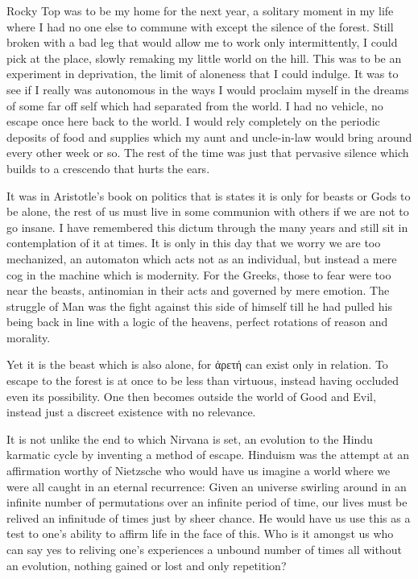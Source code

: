 \documentclass[ebook, 10pt, openright, onecolumn]{memoir}
\newcommand{\textgreek}[1]{\begingroup\fontencoding{LGR}\selectfont#1\endgroup}
\begin{document}
Rocky Top was to be my home for the next year, a solitary moment in my life
where I had no one else to commune with except the silence of the forest.  Still
broken with a bad leg that would allow me to work only intermittently, I could
pick at the place, slowly remaking my little world on the hill.  This was to be
an experiment in deprivation, the limit of aloneness that I could indulge.  It
was to see if I really was autonomous in the ways I would proclaim myself in the
dreams of some far off self which had separated from the world.  I had no
vehicle, no escape once here back to the world.  I would rely completely on the
periodic deposits of food and supplies which my aunt and uncle-in-law would
bring around every other week or so.  The rest of the time  was just that
pervasive silence which builds to a crescendo that hurts the ears.

It was in Aristotle's book on politics that is states it is only for beasts or
Gods to be alone, the rest of us must live in some communion with others if we
are not to go insane.  I have remembered this dictum through the many years and
still sit in contemplation of it at times.  It is only in this day that we worry
we are too mechanized, an automaton which acts not as an individual, but instead
a mere cog in the machine which is modernity.  For the Greeks, those to fear
were too near the beasts, antinomian in their acts and governed by mere emotion.
The struggle of Man was the fight against this side of himself till he had
pulled his being back in line with a logic of the heavens, perfect rotations of
reason and morality.

Yet it is the beast which is also alone, for \textgreek{ἀρετή} can exist only in
relation.  To escape to the forest is at once to be less than virtuous, instead
having occluded even its possibility.  One then becomes outside the world of
Good and Evil, instead just a discreet existence with no relevance.

It is not unlike the end to which Nirvana is set, an evolution to the Hindu
karmatic cycle by inventing a method of escape.  Hinduism was the attempt at an
affirmation worthy of Nietzsche who would have us imagine a world where we were
all caught in an eternal recurrence: Given an universe swirling around in an
infinite number of permutations over an infinite period of time, our lives must
be relived an infinitude of times just by sheer chance.  He would have us use
this as a test to one's ability to affirm life in the face of this.  Who is it
amongst us who can say yes to reliving one's experiences a unbound number of
times all without an evolution, nothing gained or lost and only repetition?
\end{document}
